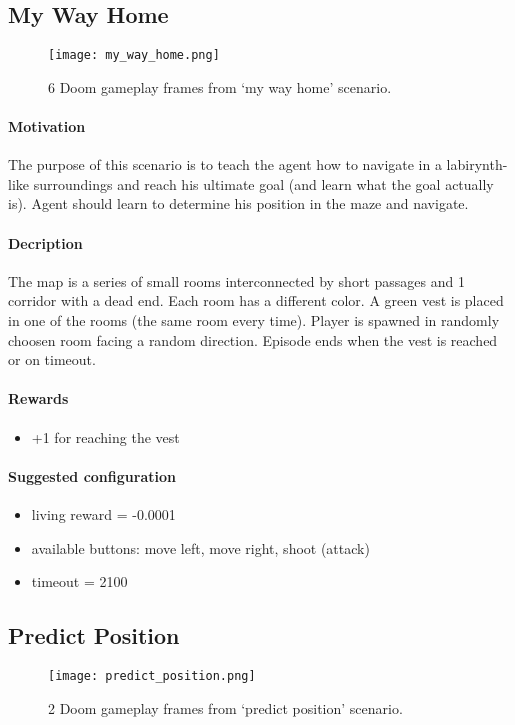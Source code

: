 	\subsection{My Way Home}
		\begin{figure}
			\centering
			\texttt{[image: my\_way\_home.png]}
			\caption{6 Doom gameplay frames from `my way home' scenario.}\label{fig:my_way_home}
		\end{figure}
		\paragraph{Motivation} 
			The purpose of this scenario is to teach the agent how to navigate in a labirynth-like surroundings and reach his ultimate goal (and learn what the goal actually is). Agent should learn to determine his position in the maze and navigate.

		\paragraph{Decription}
			The map is a series of small rooms interconnected by short passages and 1 corridor with a dead end. Each room has a different color. A green vest is placed in one of the rooms (the same room every time). Player is spawned in randomly choosen room facing a random direction. Episode ends when the vest is reached or on timeout.
		\paragraph{Rewards}

		\begin{itemize}
			\item +1 for reaching the vest
		\end{itemize}
		
		\paragraph{Suggested configuration}
		\begin{itemize}
			\item living reward = -0.0001
			\item available buttons: move left, move right, shoot (attack)
			\item timeout = 2100
		\end{itemize}
	\newpage

	\subsection{Predict Position}
		\begin{figure}
			\centering
			\texttt{[image: predict\_position.png]}
			\caption{2 Doom gameplay frames from `predict position' scenario.}\label{fig:predict_position}
		\end{figure}
